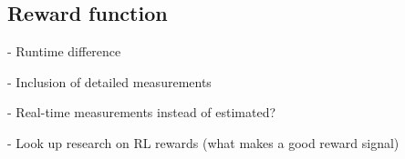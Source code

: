 
\subsection{Reward function}
\label{sec:prob:subsec:rwd}
- Runtime difference

- Inclusion of detailed measurements

- Real-time measurements instead of estimated?

- Look up research on RL rewards (what makes a good reward signal)
